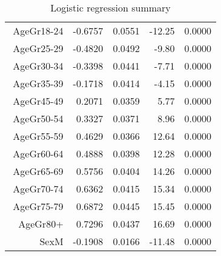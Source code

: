 \begin{table}[ht]
\begin{tabular}{rrrrr}
$$  AgeGr18-24 & -0.6757 & 0.0551 & -12.25 & 0.0000 \\ 
  AgeGr25-29 & -0.4820 & 0.0492 & -9.80 & 0.0000 \\ 
  AgeGr30-34 & -0.3398 & 0.0441 & -7.71 & 0.0000 \\ 
  AgeGr35-39 & -0.1718 & 0.0414 & -4.15 & 0.0000 \\ 
  AgeGr45-49 & 0.2071 & 0.0359 & 5.77 & 0.0000 \\ 
  AgeGr50-54 & 0.3327 & 0.0371 & 8.96 & 0.0000 \\ 
  AgeGr55-59 & 0.4629 & 0.0366 & 12.64 & 0.0000 \\ 
  AgeGr60-64 & 0.4888 & 0.0398 & 12.28 & 0.0000 \\ 
  AgeGr65-69 & 0.5756 & 0.0404 & 14.26 & 0.0000 \\ 
  AgeGr70-74 & 0.6362 & 0.0415 & 15.34 & 0.0000 \\ 
  AgeGr75-79 & 0.6872 & 0.0445 & 15.45 & 0.0000 \\ 
  AgeGr80+ & 0.7296 & 0.0437 & 16.69 & 0.0000 \\ 
  SexM & -0.1908 & 0.0166 & -11.48 & 0.0000 \\ 
   \hline
\end{tabular}
\caption{Logistic regression summary} 
\end{table}
